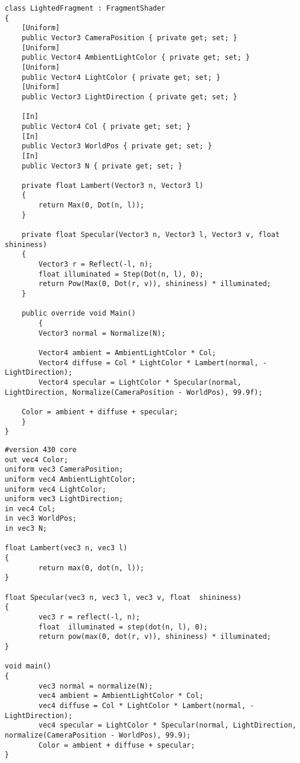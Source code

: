 \begin{lstlisting}[caption = {Fragment shader written in C\#}, label = {lst:sharpFragment}]
class LightedFragment : FragmentShader
{
    [Uniform]
    public Vector3 CameraPosition { private get; set; }
    [Uniform]
    public Vector4 AmbientLightColor { private get; set; }
    [Uniform]
    public Vector4 LightColor { private get; set; }
    [Uniform]
    public Vector3 LightDirection { private get; set; }

    [In]
    public Vector4 Col { private get; set; }
    [In]
    public Vector3 WorldPos { private get; set; }
    [In]
    public Vector3 N { private get; set; }

    private float Lambert(Vector3 n, Vector3 l)
    {
        return Max(0, Dot(n, l));
    }

    private float Specular(Vector3 n, Vector3 l, Vector3 v, float shininess)
    {
        Vector3 r = Reflect(-l, n);
        float illuminated = Step(Dot(n, l), 0);
        return Pow(Max(0, Dot(r, v)), shininess) * illuminated;
    }

    public override void Main()
        {
        Vector3 normal = Normalize(N);

        Vector4 ambient = AmbientLightColor * Col;
        Vector4 diffuse = Col * LightColor * Lambert(normal, -LightDirection);
        Vector4 specular = LightColor * Specular(normal, LightDirection, Normalize(CameraPosition - WorldPos), 99.9f);

    Color = ambient + diffuse + specular;
    }
}
\end{lstlisting}

\begin{lstlisting}[caption = {Fragment shader translated in GLSL}, label = {lst:outputFragment}]
#version 430 core
out vec4 Color;
uniform vec3 CameraPosition;
uniform vec4 AmbientLightColor;
uniform vec4 LightColor;
uniform vec3 LightDirection;
in vec4 Col;
in vec3 WorldPos;
in vec3 N;

float Lambert(vec3 n, vec3 l)
{
        return max(0, dot(n, l));
}

float Specular(vec3 n, vec3 l, vec3 v, float  shininess)
{
        vec3 r = reflect(-l, n);
        float  illuminated = step(dot(n, l), 0);
        return pow(max(0, dot(r, v)), shininess) * illuminated;
}

void main()
{
        vec3 normal = normalize(N);
        vec4 ambient = AmbientLightColor * Col;
        vec4 diffuse = Col * LightColor * Lambert(normal, -LightDirection);
        vec4 specular = LightColor * Specular(normal, LightDirection, normalize(CameraPosition - WorldPos), 99.9);
        Color = ambient + diffuse + specular;
}
\end{lstlisting}

